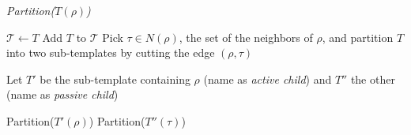 \begin{algorithm}[ht]
 \caption{\emph{Partition($T(\rho)$)}}
 \label{alg:partition}
\begin{algorithmic}[1]
    \STATE $\mathcal{T} \leftarrow T$
  \ELSE
   \STATE Add $T$ to $\mathcal{T}$
   \STATE Pick $\tau \in N(\rho)$, the set of the neighbors of $\rho$,
and partition $T$ into two sub-templates by cutting the edge $(\rho, \tau)$

   \STATE Let $T'$ be the sub-template containing $\rho$ (name as \textit{active child}) and
$T''$ the other (name as \textit{passive child})

   \STATE Partition($T'(\rho)$)
   \STATE Partition($T''(\tau)$)
  \ENDIF
 \ENDIF
\end{algorithmic}
\end{algorithm}


